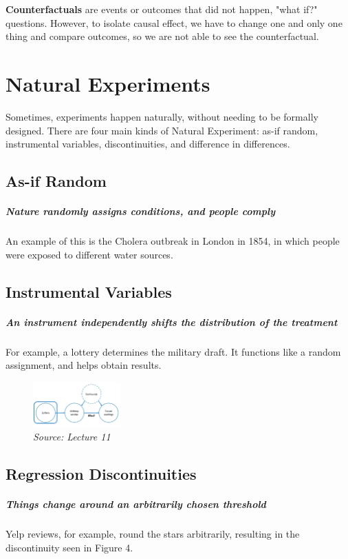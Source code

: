 \textbf{Counterfactuals} are events or outcomes that did not happen, "what if?" questions. However, to isolate causal effect, we have to change one and only one thing and compare outcomes, so we are not able to see the counterfactual.

\section{Natural Experiments}

Sometimes, experiments happen naturally, without needing to be formally designed. There are four main kinds of Natural Experiment: as-if random, instrumental variables, discontinuities, and difference in differences.

\subsection{As-if Random}
\subparagraph{Nature randomly assigns conditions, and people comply} An example of this is the Cholera outbreak in London in 1854, in which people were exposed to different water sources.

\subsection{Instrumental Variables}
\subparagraph{An instrument independently shifts the distribution of the treatment} For example, a lottery determines the military draft. It functions like a random assignment, and helps obtain results.

\begin{figure}[ht]
  \begin{center}
    \includegraphics[width=0.3\textwidth]{figures/f3}
        \caption{ \textit{ Source: Lecture 11}}
    \label{figure 3}
  \end{center}
\end{figure}


\subsection{Regression Discontinuities}
\subparagraph{Things change around an arbitrarily chosen threshold} Yelp reviews, for example, round the stars arbitrarily, resulting in the discontinuity seen in Figure 4.

